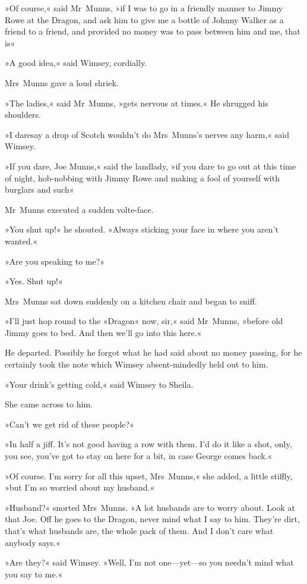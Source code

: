 »Of course,« said Mr~Munns, »if I was to go in a friendly manner to Jimmy Rowe at the Dragon, and ask him to give me a bottle of Johnny Walker as a friend to a friend, and provided no money was to pass between him and me, that is\longdash«

»A good idea,« said Wimsey, cordially.

Mrs~Munns gave a loud shriek.

»The ladies,« said Mr~Munns, »gets nervous at times.« He shrugged his shoulders.

»I daresay a drop of Scotch wouldn't do Mrs~Munns's nerves any harm,« said Wimsey.

»If you dare, Joe Munns,« said the landlady, »if you dare to go out at this time of night, hob-nobbing with Jimmy Rowe and making a fool of yourself with burglars and such\longdash«

Mr~Munns executed a sudden volte-face.

»You shut up!« he shouted. »Always sticking your face in where you aren't wanted.«

»Are you speaking to me?«

»Yes. Shut up!«

Mrs~Munns sat down suddenly on a kitchen chair and began to sniff.

»I'll just hop round to the »Dragon« now, sir,« said Mr~Munns, »before old Jimmy goes to bed. And then we'll go into this here.«

He departed. Possibly he forgot what he had said about no money passing, for he certainly took the note which Wimsey absent-mindedly held out to him.

»Your drink's getting cold,« said Wimsey to Sheila.

She came across to him.

»Can't we get rid of these people?«

»In half a jiff. It's not good having a row with them. I'd do it like a shot, only, you see, you've got to stay on here for a bit, in case George comes back.«

»Of course. I'm sorry for all this upset, Mrs~Munns,« she added, a little stiffly, »but I'm so worried about my husband.«

»Husband?« snorted Mrs~Munns. »A lot husbands are to worry about. Look at that Joe. Off he goes to the Dragon, never mind what I say to him. They're dirt, that's what husbands are, the whole pack of them. And I don't care what anybody says.«

»Are they?« said Wimsey. »Well, I'm not one—yet—so you needn't mind what you say to me.«

